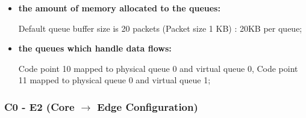 \documentclass[conference,compsoc]{IEEEtran}
\begin{document}
\begin{itemize}
     \vspace{5mm}
     \item \textbf{the amount of memory allocated to the queues:}\par

     Default queue buffer size is 20 packets (Packet size 1 KB) : 20KB per queue;


     \vspace{5mm}
     \item \textbf{the queues which handle data flows:}\par
     Code point 10 mapped to physical queue 0 and virtual queue 0, Code point 11 mapped to physical queue 0 and virtual queue 1;

     \end{itemize}


     \subsubsection{C0 - E2 (Core $\rightarrow$ Edge Configuration)}
\end{document}
